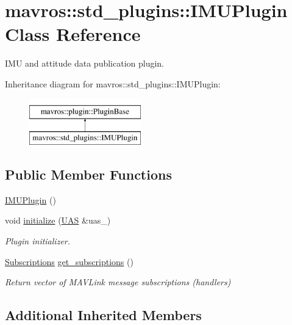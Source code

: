 \hypertarget{classmavros_1_1std__plugins_1_1IMUPlugin}{}\section{mavros\+::std\+\_\+plugins\+::I\+M\+U\+Plugin Class Reference}
\label{classmavros_1_1std__plugins_1_1IMUPlugin}


I\+MU and attitude data publication plugin.  


Inheritance diagram for mavros\+::std\+\_\+plugins\+::I\+M\+U\+Plugin\+:\begin{figure}[H]
\begin{center}
\leavevmode
\includegraphics[height=2.000000cm]{classmavros_1_1std__plugins_1_1IMUPlugin}
\end{center}
\end{figure}
\subsection*{Public Member Functions}
\begin{DoxyCompactItemize}
\item 
\mbox{\hyperlink{group__plugin_gacec05dbf6f6696b457df134f2b92c3e8}{I\+M\+U\+Plugin}} ()
\item 
void \mbox{\hyperlink{group__plugin_ga93f6f8e41038c821e395ef26bd27c905}{initialize}} (\mbox{\hyperlink{classmavros_1_1UAS}{U\+AS}} \&uas\+\_\+)
\begin{DoxyCompactList}\small\item\em Plugin initializer. \end{DoxyCompactList}\item 
\mbox{\hyperlink{group__plugin_ga8967d61fc77040e0c3ea5a4585d62a09}{Subscriptions}} \mbox{\hyperlink{group__plugin_ga380625ad9d721e273b204b1b74724e40}{get\+\_\+subscriptions}} ()
\begin{DoxyCompactList}\small\item\em Return vector of M\+A\+V\+Link message subscriptions (handlers) \end{DoxyCompactList}\end{DoxyCompactItemize}
\subsection*{Additional Inherited Members}


